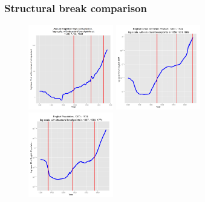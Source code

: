\documentclass[final]{beamer}
\begin{document}
\begin{frame}
		\frametitle{Structural break comparison}
\begin{figure}[p!]
		\label{fig:structural}		
		\centerline{
		\mbox{\includegraphics[width=0.33\textwidth]{energyLog1}}
		\mbox{\includegraphics[width=0.33\textwidth]{gbpgdplog}}
		\mbox{\includegraphics[width=0.33\textwidth]{popLog}}
		}
\end{figure}
\end{frame}
\end{document}
